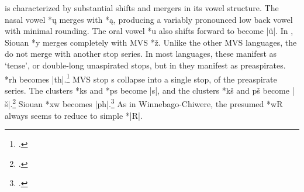 \documentclass[output=paper]{LSP/langsci}
\begin{document}
 is characterized by substantial shifts and mergers in its vowel structure.  The nasal  vowel *\k{u} merges with *\k{a}, producing a variably pronounced low back vowel with minimal rounding.  The oral vowel *u also shifts forward to become |\"u|.  In , Siouan *y merges completely with MVS *\v{z}.  Unlike the other MVS languages, the  do not merge with another stop series.  In most  languages, these manifest as `tense', or double-long unaspirated stops, but in  they manifest as preaspirates.   *rh becomes |th|.\footnote{\citealt[165]{Rankinetal2006PDF}.} MVS stop s collapse into a single stop, of the preaspirate series.  The clusters *ks and *ps become |s|, and the clusters *kš and pš become |š|.\footnote{\citealt[64, 123, 222, 849]{Rankinetal2006PDF}.} Siouan *xw becomes |ph|.\footnote{\citealt[180]{Rankinetal2006PDF}.} As in Winnebago-Chiwere, the presumed  *wR always seems to reduce to simple *|R|.
\end{document}
